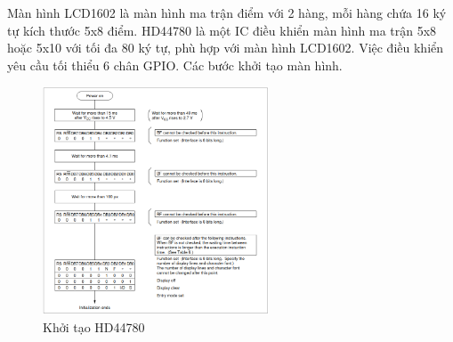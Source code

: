 
Màn hình LCD1602 là màn hình ma trận điểm với 2 hàng, mỗi hàng chứa 16 ký tự kích thước 5x8 điểm. HD44780 là một IC điều khiển màn hình ma trận 5x8 hoặc 5x10 với tối đa 80 ký tự, phù hợp với màn hình LCD1602. Việc điều khiển yêu cầu tối thiểu 6 chân GPIO. Các bước khởi tạo màn hình.


\begin{figure}[H]
	\centering
	\includegraphics[width=0.6\textwidth]{../images/hd44780_init.png}
	\caption{Khởi tạo HD44780}
\end{figure}